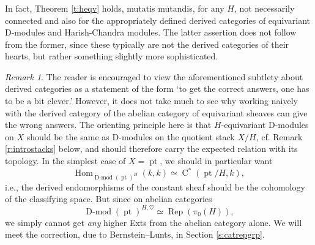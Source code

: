 \documentclass[10pt]{amsart}
\newcommand{\on}{\operatorname}
\newcommand{\Dmod}{\on{D-mod}}
\theoremstyle{remark}
\newtheorem{re}[subsubsection]{Remark}
\numberwithin{equation}{section}
\begin{document}
	\subsubsection{} In fact, Theorem \ref{t:heqv} holds, {mutatis 
	mutandis}, for any 
	$H$, 
	not necessarily connected and also for the appropriately defined derived 
	categories of equivariant D-modules and Harish-Chandra modules. The latter 
	assertion does not follow from the former, since these typically are not 
	the 
	derived categories 
	of their hearts, but rather something slightly more 
	sophisticated.
	
	
	
	\begin{re} The 
		reader is encouraged to view the aforementioned subtlety about derived categories as a statement of the form `to get the 
		correct 
		answers, one has to be a bit clever.' However, it does not take much to 
		see why 
		working naively with the derived category of the abelian category of equivariant sheaves can give the wrong answers. The orienting principle here 
		is that 
		$H$-equivariant D-modules on $X$ should be the same as D-modules on the 
		quotient stack $X/H$, cf. Remark \ref{r:introstacks} below, and should therefore carry the expected relation 
		with its 
		topology. In the simplest case of $X = \on{pt}$, we should 
		in particular want 
		\[
		\on{Hom}_{\Dmod(\on{pt})^H}(k, k) \simeq \on{C}^*(\on{pt}/H, k),
		\]
		i.e., the derived endomorphisms of the constant sheaf should be the 
		cohomology 
		of 
		the classifying space. But since on abelian categories
		\[
		\Dmod(\on{pt})^{H, \heartsuit} \simeq \on{Rep}(\pi_0(H)),
		\]
		we simply cannot get {\em any} higher Exts from the abelian category 
		alone. We 
		will 
		meet the correction, due to Bernstein--Lunts, in Section \ref{s:catrepgrp}. 
	
	
	\end{re}
	
\end{document}

